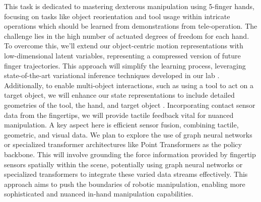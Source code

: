 \documentclass{erc-B2}
\begin{document}
\begin{enumerate}
This task is dedicated to mastering dexterous manipulation using 5-finger hands, focusing on tasks like object reorientation and tool usage within intricate operations which should be learned from demonstrations from tele-operation. The challenge lies in the high number of actuated degrees of freedom for each hand. To overcome this, we'll extend our object-centric motion representations with low-dimensional latent variables, representing a compressed version of future finger trajectories. This approach will simplify the learning process, leveraging state-of-the-art variational inference techniques developed in our lab \cite{Volpp23}.
Additionally, to enable multi-object interactions, such as using a tool to act on a target object, we will enhance our state representations to include detailed geometries of the tool, the hand, and target object \cite{gao2023k}. Incorporating contact sensor data from the fingertips, we will provide tactile feedback vital for nuanced manipulation.
A key aspect here is efficient sensor fusion, combining tactile, geometric, and visual data. We plan to explore the use of graph neural networks \cite{scarselli2008graph} or specialized transformer architectures like Point Transformers \cite{zhao2021point} as the policy backbone. This will involve grounding the force information provided by fingertip sensors spatially within the scene, potentially using graph neural networks or specialized transformers to integrate these varied data streams effectively. This approach aims to push the boundaries of robotic manipulation, enabling more sophisticated and nuanced in-hand manipulation capabilities.


\end{enumerate}
\end{document}
